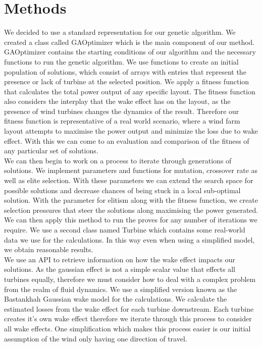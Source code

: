 \documentclass{article}
\begin{document}
\section{Methods}

 We decided to use a standard representation for our genetic algorithm. We created a class called GAOptimizer which is the main component of our method. GAOptimizer contains the starting conditions of our algorithm and the necessary functions to run the genetic algorithm. We use functions to create an initial population of solutions, which consist of arrays with entries that represent the presence or lack of turbine at the selected position. We apply a fitness function that calculates the total power output of any specific layout. The fitness function also considers the interplay that the wake effect has on the layout, as the presence of wind turbines changes the dynamics of the result. Therefore our fitness function is representative of a real world scenario, where a wind farm layout attempts to maximise the power output and minimize the loss due to wake effect. With this we can come to an evaluation and comparison of the fitness of any particular set of solutions.
\newline
\\
We can then begin to work on a process to iterate through generations of solutions. We implement parameters and functions for mutation, crossover rate as well as elite selection. With these parameters we can extend the search space for possible solutions and decrease chances of being stuck in a local sub-optimal solution. With the parameter for elitism along with the fitness function, we create selection pressures that steer the solutions along maximising the power generated. We can then apply this method to run the proves for any number of iterations we require. We use a second class named Turbine which contains some real-world data we use for the calculations. In this way even when using a simplified model, we obtain reasonable results.
\newline
\\
We use an API to retrieve information on how the wake effect impacts our solutions. As the gaussian effect is not a simple scalar value that effects all turbines equally, therefore we must consider how to deal with a complex problem from the realm of fluid dynamics. We use a simplified version known as the Bastankhah Gaussian wake model for the calculations. We calculate the estimated losses from the wake effect for each turbine downstream. Each turbine creates it’s own wake effect therefore we iterate through this process to consider all wake effects. One simplification which makes this process easier is our initial assumption of the wind only having one direction of travel.
\end{document}
